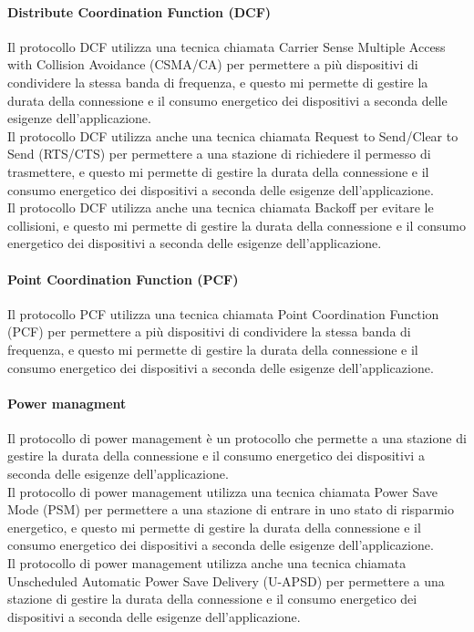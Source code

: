 \paragraph{Distribute Coordination Function (DCF)}
Il protocollo DCF utilizza una tecnica chiamata Carrier Sense Multiple Access with Collision Avoidance (CSMA/CA) per permettere a più dispositivi di condividere la stessa banda di frequenza, e questo mi permette di gestire la durata della connessione e il consumo energetico dei dispositivi a seconda delle esigenze dell'applicazione.\\
Il protocollo DCF utilizza anche una tecnica chiamata Request to Send/Clear to Send (RTS/CTS) per permettere a una stazione di richiedere il permesso di trasmettere, e questo mi permette di gestire la durata della connessione e il consumo energetico dei dispositivi a seconda delle esigenze dell'applicazione.\\
Il protocollo DCF utilizza anche una tecnica chiamata Backoff per evitare le collisioni, e questo mi permette di gestire la durata della connessione e il consumo energetico dei dispositivi a seconda delle esigenze dell'applicazione.\\
\paragraph{Point Coordination Function (PCF)}
Il protocollo PCF utilizza una tecnica chiamata Point Coordination Function (PCF) per permettere a più dispositivi di condividere la stessa banda di frequenza, e questo mi permette di gestire la durata della connessione e il consumo energetico dei dispositivi a seconda delle esigenze dell'applicazione.\\

\paragraph{Power managment}
Il protocollo di power management è un protocollo che permette a una stazione di gestire la durata della connessione e il consumo energetico dei dispositivi a seconda delle esigenze dell'applicazione.\\
Il protocollo di power management utilizza una tecnica chiamata Power Save Mode (PSM) per permettere a una stazione di entrare in uno stato di risparmio energetico, e questo mi permette di gestire la durata della connessione e il consumo energetico dei dispositivi a seconda delle esigenze dell'applicazione.\\
Il protocollo di power management utilizza anche una tecnica chiamata Unscheduled Automatic Power Save Delivery (U-APSD) per permettere a una stazione di gestire la durata della connessione e il consumo energetico dei dispositivi a seconda delle esigenze dell'applicazione.\\

